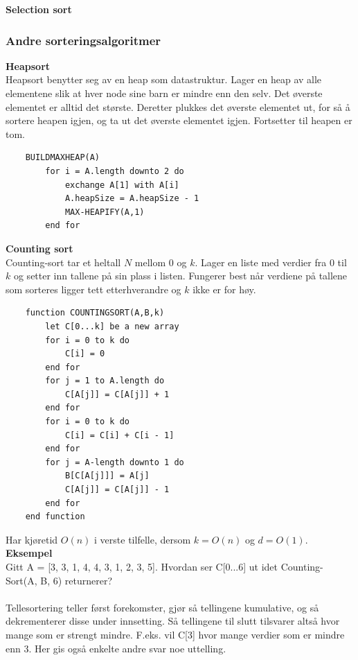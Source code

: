 \noindent \textbf{Selection sort}\\

\subsubsection{Andre sorteringsalgoritmer}

\noindent \textbf{Heapsort}\\
Heapsort benytter seg av en heap som datastruktur. Lager en heap av alle elementene slik at hver node sine barn er mindre enn den selv. Det øverste elementet er alltid det største. Deretter plukkes det øverste elementet ut, for så å sortere heapen igjen, og ta ut det øverste elementet igjen. Fortsetter til heapen er tom.

\begin{lstlisting}
    BUILDMAXHEAP(A)
        for i = A.length downto 2 do
	        exchange A[1] with A[i]
	        A.heapSize = A.heapSize - 1
	        MAX-HEAPIFY(A,1)
        end for
\end{lstlisting}

\noindent \textbf{Counting sort}\\
Counting-sort tar et heltall $N$ mellom $0$ og $k$. Lager en liste med verdier fra $0$ til $k$ og setter inn tallene på sin plass i listen. Fungerer best når verdiene på tallene som sorteres ligger tett etterhverandre og $k$ ikke er for høy.

\begin{lstlisting}
    function COUNTINGSORT(A,B,k)
	    let C[0...k] be a new array
    	for i = 0 to k do
    		C[i] = 0
    	end for
    	for j = 1 to A.length do
    		C[A[j]] = C[A[j]] + 1
    	end for
    	for i = 0 to k do
    		C[i] = C[i] + C[i - 1]
    	end for
    	for j = A-length downto 1 do
    		B[C[A[j]]] = A[j]
    		C[A[j]] = C[A[j]] - 1
    	end for
    end function
\end{lstlisting}

\noindent Har kjøretid $O(n)$ i verste tilfelle, dersom $k = O(n)$ og $d = O(1)$.\\

\noindent \textbf{Eksempel}\\
Gitt A = [3, 3, 1, 4, 4, 3, 1, 2, 3, 5]. Hvordan ser C[0...6] ut idet Counting-Sort(A, B, 6) returnerer?
\\\\
[0, 0, 2, 3, 7, 9, 10] Tellesortering teller først forekomster, gjør så tellingene kumulative, og så dekrementerer disse under innsetting. Så tellingene til slutt tilsvarer altså hvor mange som er strengt mindre. F.eks. vil C[3] hvor mange verdier som er mindre enn 3. Her gis også enkelte andre svar noe uttelling. \\

